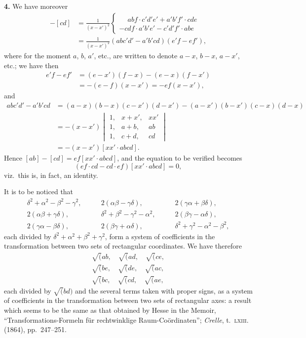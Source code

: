 \documentclass[11pt,a4paper]{article}
\theoremstyle{plain}
\theoremstyle{definition}
\begin{document}
\smallskip

\noindent\textbf{4.} We have moreover
\begin{align*}
[ab] - [cd] &= \frac{1}{(x - x')^2} \begin{cases}
\phantom{-}abf \cdot c'd'e' + a'b'f' \cdot cde \\
- cdf \cdot a'b'e' - c'd'f' \cdot abe
\end{cases} \\
&= \frac{1}{(x - x')^2}(abc'd' - a'b'cd)(e'f - ef'),
\end{align*}
where for the moment $a$, $b$, $a'$, etc., are written to denote $a - x$, $b - x$, $a - x'$, etc.; we have then
\begin{align*}
e'f - ef' &= (e - x')(f - x) - (e - x)(f - x') \\
&= -(e - f)(x - x') = -ef(x - x'),
\end{align*}
and
\begin{align*}
abc'd' - a'b'cd &= (a - x)(b - x)(c - x')(d - x') - (a - x')(b - x')(c - x)(d - x) \\
&= -(x - x') \begin{vmatrix} 1, & x + x', & xx' \\ 1, & a + b, & ab \\ 1, & c + d, & cd \end{vmatrix} \\
&= -(x - x')[xx' \cdot abcd].
\end{align*}
Hence $[ab] - [cd] = ef[xx' \cdot abcd]$, and the equation to be verified becomes
\[
(ef \cdot cd - cd \cdot ef)[xx' \cdot abcd] = 0,
\]
viz.~this is, in fact, an identity.

\smallskip

It is to be noticed that
\begin{align*}
\delta^2 + \alpha^2 - \beta^2 - \gamma^2, &\qquad 2(\alpha\beta - \gamma\delta), &\qquad 2(\gamma\alpha + \beta\delta), \\
2(\alpha\beta + \gamma\delta), &\qquad \delta^2 + \beta^2 - \gamma^2 - \alpha^2, &\qquad 2(\beta\gamma - \alpha\delta), \\
2(\gamma\alpha - \beta\delta), &\qquad 2(\beta\gamma + \alpha\delta), &\qquad \delta^2 + \gamma^2 - \alpha^2 - \beta^2,
\end{align*}
each divided by $\delta^2 + \alpha^2 + \beta^2 + \gamma^2$, form a system of coefficients in the transformation between two sets of rectangular coordinates. We have therefore
\begin{align*}
\surd(ab, \quad \surd(ad, \quad \surd(ce, \\
\surd(be, \quad \surd(de, \quad \surd(ac, \\
\surd(bc, \quad \surd(cd, \quad \surd(ae,
\end{align*}
each divided by $\surd(bd)$ and the several terms taken with proper signs, as a system of coefficients in the transformation between two sets of rectangular axes: a result which seems to be the same as that obtained by Hesse in the Memoir, ``Transformations-Formeln f\"ur rechtwinklige Raum-Co\"ordinaten''; \emph{Crelle}, t.~\textsc{lxiii}. (1864), pp.~247--251.
\end{document}
